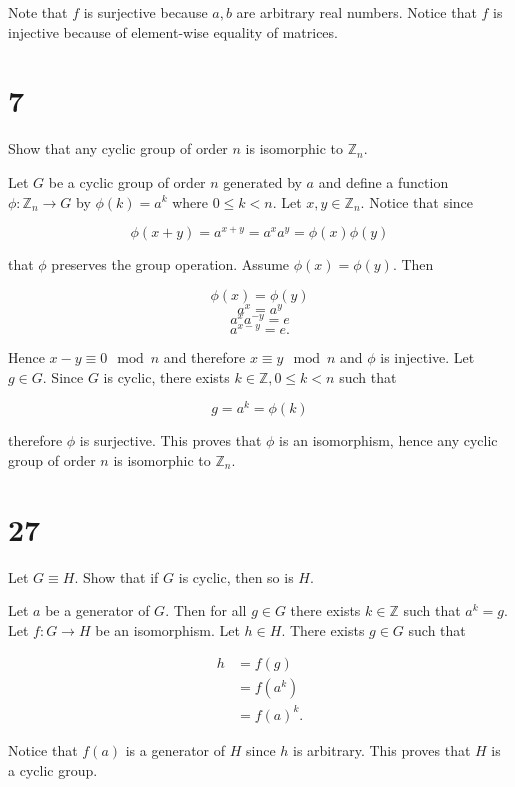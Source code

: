 \documentclass[a4paper]{article}
\begin{document}
Note that $f$ is surjective because $a,b$ are arbitrary real numbers. Notice that $f$ is injective because of element-wise equality of matrices.


\section*{7}

Show that any cyclic group of order $n$ is isomorphic to $\mathbb{Z}_n$.

\vspace{\baselineskip}

Let $G$ be a cyclic group of order $n$ generated by $a$ and define a function $\phi : \mathbb{Z}_n \rightarrow G$ by $\phi(k) = a^k$ where $0 \leq k < n$. Let $x,y \in \mathbb{Z}_n$. 
Notice that since

$$\phi(x + y) = a^{x+y} = a^x a^y = \phi(x) \phi(y)$$

that $\phi$ preserves the group operation. Assume $\phi(x) = \phi(y)$. Then

$$\phi(x) = \phi(y)$$
$$a^x = a^y$$
$$a^x a^{-y} = e$$
$$a^{x-y} = e.$$

Hence $x - y \equiv 0 \mod n$ and therefore $x \equiv y \mod n$ and $\phi$ is injective. Let $g \in G$. Since $G$ is cyclic, there exists $k \in \mathbb{Z}, 0 \leq k < n$ such that

$$g = a^k = \phi(k)$$

therefore $\phi$ is surjective. This proves that $\phi$ is an isomorphism, hence any cyclic group of order $n$ is isomorphic to $\mathbb{Z}_n$.


\section*{27}

Let $G \equiv H$. Show that if $G$ is cyclic, then so is $H$.

\vspace{\baselineskip}

Let $a$ be a generator of $G$. Then for all $g \in G$ there exists $k \in \mathbb{Z}$ such that $a^k = g$. Let $f: G \rightarrow H$ be an isomorphism. Let $h \in H$. There exists $g \in G$ such that

\begin{align*}
h &= f(g) \\
&= f(a^k) \\
&= f(a)^k.
\end{align*}

Notice that $f(a)$ is a generator of $H$ since $h$ is arbitrary. This proves that $H$ is a cyclic group.
\end{document}
